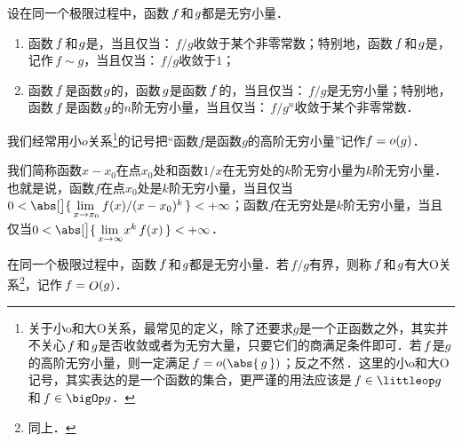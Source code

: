 \begin{definition*}
  设在同一个极限过程中，函数\(\,f\mkern2mu\)和\(\mkern1mu g\)都是无穷小量．
  \begin{enumerate}[topsep=3pt,itemsep=0ex]
    \renewcommand{\labelenumi}{\enumparen{\arabic{enumi}}}
  \item 函数\(\,f\mkern2mu\)和\(\mkern1mu g\)是，当且仅当：\(\,f/g\)收敛于某个非零常数；特别地，函数\(\,f\mkern2mu\)和\(\mkern1mu g\)是\mbox{}，记作\(\,f \sim g\)，当且仅当：\(\,f/g\)收敛于\(1\)；
  \item 函数\(\,f\mkern2mu\)是函数\(\mkern1mu g\)的，函数\(\mkern2mu g\)是函数\(\,f\mkern2mu\)的，当且仅当：\(\,f/g\)是无穷小量；特别地，函数\(\,f\mkern2mu\)是函数\(\mkern2mu g\)的\(n\)阶无穷小量，当且仅当：\(\,f/g^n\)收敛于某个非零常数．
  \end{enumerate}

  \begin{remark}
    我们经常用小\(o\)关系\footnote{关于小o和大O关系，最常见的定义，除了还要求\(g\)是一个正函数之外，其实并不关心\(\mkern2mu f\mkern2mu\)和\(\mkern2mu g\)是否收敛或者为无穷大量，只要它们的商满足条件即可．若\(\mkern2mu f\mkern1mu\)是\(g\)的高阶无穷小量，则一定满足\(\,f = \littleo(\abs{\,g\,})\)；反之不然\,．这里的小o和大O记号，其实表达的是一个函数的集合，更严谨的用法应该是\(\,f \in \littleop g\)和\(\,f \in \bigOp g\)．}的记号把“函数\(f\)是函数\(g\)的高阶无穷小量”记作\(f= \mathop{\relax o}\nolimits(g)\)．
  \end{remark}

  \begin{remark}
    我们简称函数\(x-x_0\)在点\(x_0\)处和函数\(1/x\)在无穷处的\(k\)阶无穷小量为\(k\)阶无穷小量．也就是说，函数\(f\)在点\(x_0\)处是\(k\)阶无穷小量，当且仅当\(0 < \abs[\big]{\,\lim\limits_{x \to x_0\!} {\,f(x)}/{(x-x_0)^k}\,} < +\infty\)；函数\(f\)在无穷处是\(k\)阶无穷小量，当且仅当\(0 < \abs[\big]{\,\lim\limits_{x\to\infty\!} x^k\,f(x)\,} < +\infty\)．
  \end{remark}
\end{definition*}

\begin{definition*}
  在同一个极限过程中，函数\(\,f\mkern2mu\)和\(\mkern1mu g\)都是无穷小量．若\(\,f/g\)有界，则称\(\,f\mkern2mu\)和\(\mkern1mu g\)有大O关系\footnote{同上．}，记作\(\,f = \mathop{\relax O}\nolimits(g)\)．
\end{definition*}

